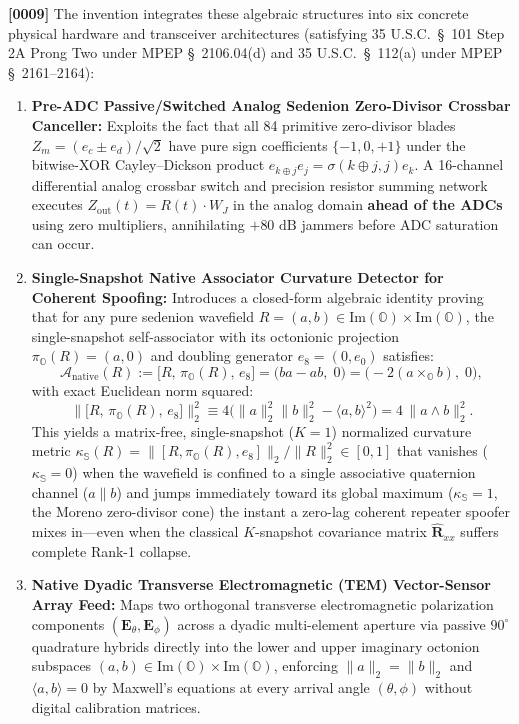 \documentclass[12pt,letterpaper]{article}
\begin{document}
\textbf{[0009]} The invention integrates these algebraic structures into six concrete physical hardware and transceiver architectures (satisfying 35 U.S.C.\ \S\ 101 Step 2A Prong Two under MPEP \S\ 2106.04(d) and 35 U.S.C.\ \S\ 112(a) under MPEP \S\ 2161--2164):
\begin{enumerate}[leftmargin=18pt,itemsep=2pt]
    \item \textbf{Pre-ADC Passive/Switched Analog Sedenion Zero-Divisor Crossbar Canceller:} Exploits the fact that all 84 primitive zero-divisor blades $Z_m = (e_c \pm e_d)/\sqrt{2}$ have pure sign coefficients $\{-1, 0, +1\}$ under the bitwise-XOR Cayley--Dickson product $e_{k\oplus j} e_j = \sigma(k\oplus j, j) e_k$. A 16-channel differential analog crossbar switch and precision resistor summing network executes $Z_{\mathrm{out}}(t) = R(t) \cdot W_J$ in the analog domain \textbf{ahead of the ADCs} using zero multipliers, annihilating $+80\text{ dB}$ jammers before ADC saturation can occur.
    \item \textbf{Single-Snapshot Native Associator Curvature Detector for Coherent Spoofing:} Introduces a closed-form algebraic identity proving that for any pure sedenion wavefield $R = (a, b) \in \mathrm{Im}(\mathbb{O}) \times \mathrm{Im}(\mathbb{O})$, the single-snapshot self-associator with its octonionic projection $\pi_{\mathbb{O}}(R) = (a, 0)$ and doubling generator $e_8 = (0, e_0)$ satisfies:
    \[
        \mathcal{A}_{\mathrm{native}}(R) := \bigl[R,\, \pi_{\mathbb{O}}(R),\, e_8\bigr] = \bigl(ba - ab,\; 0\bigr) = \bigl(-2(a \times_{\mathbb{O}} b),\; 0\bigr),
    \]
    with exact Euclidean norm squared:
    \[
        \bigl\|\bigl[R,\, \pi_{\mathbb{O}}(R),\, e_8\bigr]\bigr\|_2^2 \equiv 4\bigl(\|a\|_2^2 \|b\|_2^2 - \langle a, b \rangle^2\bigr) = 4\,\|a \wedge b\|_2^2.
    \]
    This yields a matrix-free, single-snapshot ($K=1$) normalized curvature metric $\kappa_{\mathbb{S}}(R) = \|[R,\pi_{\mathbb{O}}(R),e_8]\|_2 / \|R\|_2^2 \in [0, 1]$ that vanishes ($\kappa_{\mathbb{S}}=0$) when the wavefield is confined to a single associative quaternion channel ($a \parallel b$) and jumps immediately toward its global maximum ($\kappa_{\mathbb{S}}=1$, the Moreno zero-divisor cone) the instant a zero-lag coherent repeater spoofer mixes in---even when the classical $K$-snapshot covariance matrix $\hat{\mathbf{R}}_{xx}$ suffers complete Rank-1 collapse.
    \item \textbf{Native Dyadic Transverse Electromagnetic (TEM) Vector-Sensor Array Feed:} Maps two orthogonal transverse electromagnetic polarization components $(\mathbf{E}_\theta, \mathbf{E}_\phi)$ across a dyadic multi-element aperture via passive $90^\circ$ quadrature hybrids directly into the lower and upper imaginary octonion subspaces $(a, b) \in \mathrm{Im}(\mathbb{O}) \times \mathrm{Im}(\mathbb{O})$, enforcing $\|a\|_2 = \|b\|_2$ and $\langle a, b \rangle = 0$ by Maxwell's equations at every arrival angle $(\theta, \phi)$ without digital calibration matrices.

\end{enumerate}
\end{document}
